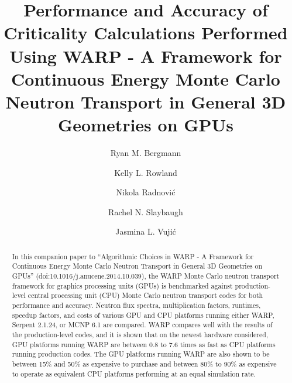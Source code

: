 \documentclass[preprint,12pt]{elsarticle}
\begin{document}
\begin{frontmatter}



\title{Performance and Accuracy of Criticality Calculations Performed Using WARP - A Framework for Continuous Energy Monte Carlo Neutron Transport in General 3D Geometries on GPUs}


\author{Ryan M. Bergmann}

\author{Kelly L. Rowland}

\author{Nikola Radnovi\'c}

\author{Rachel N. Slaybaugh}

\author{Jasmina L. Vuji\'c}


\address{Department of Nuclear Engineering, 
4155 Etcheverry Hall, 
University of California - Berkeley,
Berkeley, CA 94720-1730}

\begin{abstract}

In this companion paper to ``Algorithmic Choices in WARP - A Framework for Continuous Energy Monte Carlo Neutron Transport in General 3D Geometries on GPUs'' (doi:10.1016/j.anucene.2014.10.039), the WARP Monte Carlo neutron transport framework for graphics processing units (GPUs) is benchmarked against production-level central processing unit (CPU) Monte Carlo neutron transport codes for both performance and accuracy.  Neutron flux spectra, multiplication factors, runtimes, speedup factors, and costs of various GPU and CPU platforms running either WARP, Serpent 2.1.24, or MCNP 6.1 are compared.  WARP compares well with the results of the production-level codes, and it is shown that on the newest hardware considered, GPU platforms running WARP are between 0.8 to 7.6 times as fast as CPU platforms running production codes.  The GPU platforms running WARP are also shown to be between 15\% and 50\% as expensive to purchase and between 80\% to 90\% as expensive to operate as equivalent CPU platforms performing at an equal simulation rate.  


\end{abstract}
\end{frontmatter}
\end{document}
